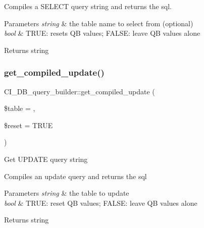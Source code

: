Compiles a S\+E\+L\+E\+CT query string and returns the sql.


\begin{DoxyParams}{Parameters}
{\em string} & the table name to select from (optional) \\
\hline
{\em bool} & T\+R\+UE\+: resets QB values; F\+A\+L\+SE\+: leave QB values alone \\
\hline
\end{DoxyParams}
\begin{DoxyReturn}{Returns}
string 
\end{DoxyReturn}
\mbox{\label{class_c_i___d_b__query__builder_a6fa661dc20fa2a32413aef4d38c198aa}} 
\subsubsection{\texorpdfstring{get\+\_\+compiled\+\_\+update()}{get\_compiled\_update()}}
{\footnotesize\ttfamily C\+I\+\_\+\+D\+B\+\_\+query\+\_\+builder\+::get\+\_\+compiled\+\_\+update (\begin{DoxyParamCaption}\item[{}]{\$table = {\ttfamily \textquotesingle{}\textquotesingle{}},  }\item[{}]{\$reset = {\ttfamily TRUE} }\end{DoxyParamCaption})}

Get U\+P\+D\+A\+TE query string

Compiles an update query and returns the sql


\begin{DoxyParams}{Parameters}
{\em string} & the table to update \\
\hline
{\em bool} & T\+R\+UE\+: reset QB values; F\+A\+L\+SE\+: leave QB values alone \\
\hline
\end{DoxyParams}
\begin{DoxyReturn}{Returns}
string 
\end{DoxyReturn}
\mbox{\label{class_c_i___d_b__query__builder_a95fc7bf89bf11f501b9cdba3c475e23c}} 
